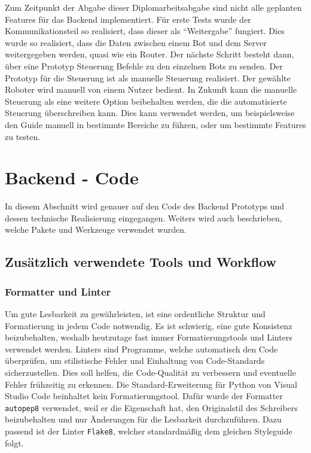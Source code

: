 Zum Zeitpunkt der Abgabe dieser Diplomarbeitsabgabe 
sind nicht alle geplanten Features für das Backend implementiert.
%
Für erste Tests wurde der Kommunikationsteil so realisiert, 
dass dieser als ``Weitergabe'' fungiert.
%
Dies wurde so realisiert,
dass die Daten zwischen einem Bot und dem Server weitergegeben werden,
quasi wie ein Router.
%
Der nächste Schritt besteht dann,
über eine Prototyp Steuerung Befehle zu den einzelnen Bots zu senden.
%
Der Prototyp für die Steuerung ist als manuelle Steuerung realisiert. 
Der gewählte Roboter wird manuell von einem Nutzer bedient.
%
In Zukunft kann die manuelle Steuerung als eine weitere Option beibehalten werden, 
die die automatisierte Steuerung überschreiben kann.
%
Dies kann verwendet werden, 
um beispielsweise den Guide manuell in bestimmte Bereiche zu führen,
oder um bestimmte Features zu testen.

\section{Backend - Code}
In diesem Abschnitt wird genauer auf den Code des Backend Prototyps
und dessen technische Realisierung eingegangen. 
%
Weiters wird auch beschrieben,
welche Pakete und Werkzeuge verwendet wurden. 

\subsection{Zusätzlich verwendete Tools und Workflow}
\subsubsection{Formatter und Linter} 
Um gute Lesbarkeit zu gewährleisten, 
ist eine ordentliche Struktur und Formatierung in jedem Code notwendig.
%
Es ist schwierig, eine gute Konsistenz beizubehalten, 
weshalb heutzutage fast immer Formatierungstools und Linters verwendet werden. 
%
Linters sind Programme, welche automatisch den Code überprüfen, 
um stilistische Fehler und Einhaltung von Code-Standards sicherzustellen.
%
Dies soll helfen,
die Code-Qualität zu verbessern 
und eventuelle Fehler frühzeitig zu erkennen.
%
Die Standard-Erweiterung für Python von Visual Studio Code 
beinhaltet kein Formatierungstool.
%
Dafür wurde der Formatter \texttt{autopep8} verwendet, 
weil er die Eigenschaft hat,
den Originalstil des Schreibers beizubehalten
und nur Änderungen für die Lesbarkeit durchzuführen. 
%
Dazu passend ist der Linter \texttt{Flake8},
welcher standardmäßig 
dem gleichen Styleguide  folgt.


